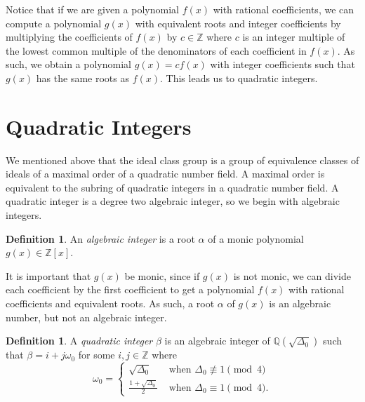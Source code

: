 \documentclass{ucalgthes1}
\theoremstyle{plain}
\theoremstyle{definition}
\newtheorem{defn}[thm]{Definition}
\newcommand{\ZZ}{\mathbb{Z}}
\newcommand{\QQ}{\mathbb{Q}}
\begin{document}
Notice that if we are given a polynomial $f(x)$ with rational coefficients, we can compute a polynomial $g(x)$ with equivalent roots and integer coefficients by multiplying the coefficients of $f(x)$ by $c \in \ZZ$ where $c$ is an integer multiple of the lowest common multiple of the denominators of each coefficient in $f(x)$.  As such, we obtain a polynomial $g(x) = cf(x)$ with integer coefficients such that $g(x)$ has the same roots as $f(x)$.  This leads us to quadratic integers.


\bigbreak
\section{Quadratic Integers}

We mentioned above that the ideal class group is a group of equivalence classes of ideals of a maximal order of a quadratic number field.  A maximal order is equivalent to the subring of quadratic integers in a quadratic number field.  A quadratic integer is a degree two algebraic integer, so we begin with algebraic integers.

\begin{defn}
An \emph{algebraic integer} is a root $\alpha$ of a monic polynomial $g(x) \in \ZZ[x]$.
\end{defn}

\noindent
It is important that $g(x)$ be monic, since if $g(x)$ is not monic, we can divide each coefficient by the first coefficient to get a polynomial $f(x)$ with rational coefficients and equivalent roots.  As such, a root $\alpha$ of $g(x)$ is an algebraic number, but not an algebraic integer.


\begin{defn}
\label{defn:quadraticInteger}
A \emph{quadratic integer} $\beta$ is an algebraic integer of $\QQ(\sqrt{\Delta_0})$ such that $\beta = i + j \omega_0$ for some $i,j \in \ZZ$ where
\[
	\omega_0 = \begin{cases}
		\sqrt{\Delta_0} & \textrm{ when } \Delta_0 \not \equiv 1 \pmod 4 \\
		\frac{1+\sqrt{\Delta_0}}{2} & \textrm{ when } \Delta_0 \equiv 1 \pmod 4.
	\end{cases}
\]
\end{defn}
\end{document}
